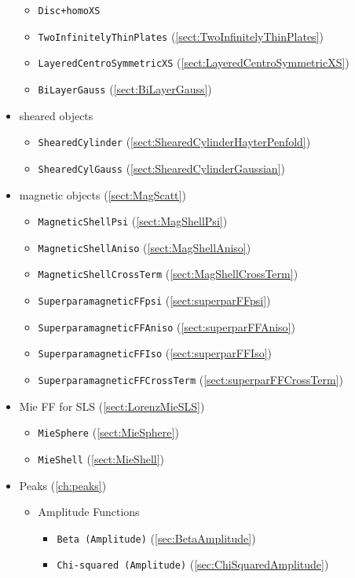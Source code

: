 \begin{itemize}
\begin{itemize}
  \item \texttt{Disc+homoXS}
  \item \texttt{TwoInfinitelyThinPlates} (\ref{sect:TwoInfinitelyThinPlates})
  \item \texttt{LayeredCentroSymmetricXS} (\ref{sect:LayeredCentroSymmetricXS})
  \item \texttt{BiLayerGauss} (\ref{sect:BiLayerGauss})
\end{itemize}
\item sheared objects
\begin{itemize}
  \item \texttt{ShearedCylinder} (\ref{sect:ShearedCylinderHayterPenfold})
  \item \texttt{ShearedCylGauss} (\ref{sect:ShearedCylinderGaussian})
\end{itemize}
\item magnetic objects (\ref{sect:MagScatt})
\begin{itemize}
  \item \texttt{MagneticShellPsi} (\ref{sect:MagShellPsi})
  \item \texttt{MagneticShellAniso} (\ref{sect:MagShellAniso})
  \item \texttt{MagneticShellCrossTerm} (\ref{sect:MagShellCrossTerm})
  \item \texttt{SuperparamagneticFFpsi} (\ref{sect:superparFFpsi})
  \item \texttt{SuperparamagneticFFAniso} (\ref{sect:superparFFAniso})
  \item \texttt{SuperparamagneticFFIso} (\ref{sect:superparFFIso})
  \item \texttt{SuperparamagneticFFCrossTerm} (\ref{sect:superparFFCrossTerm})
\end{itemize}
\item Mie FF for SLS (\ref{sect:LorenzMieSLS})
\begin{itemize}
  \item \texttt{MieSphere} (\ref{sect:MieSphere})
  \item \texttt{MieShell} (\ref{sect:MieShell})
\end{itemize}
\item Peaks (\ref{ch:peaks})
\begin{itemize}
  \item Amplitude Functions
  \begin{itemize}
    \item \texttt{Beta (Amplitude)} (\ref{sec:BetaAmplitude})
    \item \texttt{Chi-squared (Amplitude)} (\ref{sec:ChiSquaredAmplitude})

\end{itemize}
\end{itemize}
\end{itemize}
